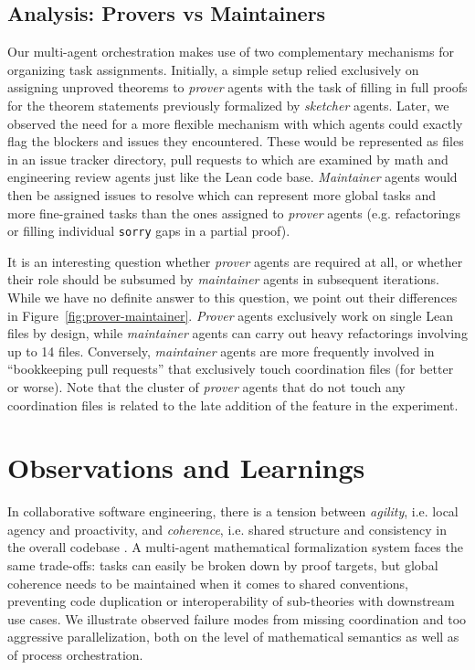 \documentclass[]{fairmeta}
\begin{document}
\subsection{Analysis: Provers vs Maintainers}


Our multi-agent orchestration makes use of two complementary mechanisms for organizing task assignments. Initially, a simple setup relied exclusively on assigning unproved theorems to \emph{prover} agents with the task of filling in full proofs for the theorem statements previously formalized by \emph{sketcher} agents.
Later, we observed the need for a more flexible mechanism with which agents could exactly flag the blockers and issues they encountered. These would be represented as files in an issue tracker directory, pull requests to which are examined by math and engineering review agents just like the Lean code base. \emph{Maintainer} agents would then be assigned issues to resolve which can represent more global tasks and more fine-grained tasks than the ones assigned to \emph{prover} agents (e.g. refactorings or filling individual \texttt{sorry} gaps in a partial proof).

It is an interesting question whether \emph{prover} agents are required at all, or whether their role should be subsumed by \emph{maintainer} agents in subsequent iterations. While we have no definite answer to this question, we point out their differences in Figure~\ref{fig:prover-maintainer}. \emph{Prover} agents exclusively work on single Lean files by design, while \emph{maintainer} agents can carry out heavy refactorings involving up to 14 files. Conversely, \emph{maintainer} agents are more frequently involved in ``bookkeeping pull requests'' that exclusively touch coordination files (for better or worse). Note that the cluster of \emph{prover} agents that do not touch any coordination files is related to the late addition of the feature in the experiment.


\section{Observations and Learnings}
\label{sec:learnings}
In collaborative software engineering, there is a tension between \emph{agility}, i.e. local agency and proactivity, and \emph{coherence}, i.e. shared structure and consistency in the overall codebase \citep[e.g., among many others][]{brooks1995mythical,boehm2003balancing,skelton2019team}. A multi-agent mathematical formalization system faces the same trade-offs: tasks can easily be broken down by proof targets, but global coherence needs to be maintained when it comes to shared conventions, preventing code duplication or interoperability of sub-theories with downstream use cases. We illustrate observed failure modes from missing coordination and too aggressive parallelization, both on the level of mathematical semantics as well as of process orchestration.
\end{document}
